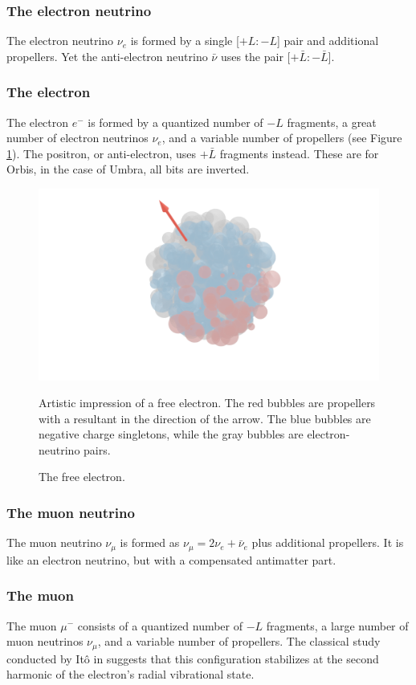 \documentclass[12pt]{article}
\begin{document}
\subsubsection{The electron neutrino}
The electron neutrino $\nu_e$ is formed by a single [$+L:-L$] pair and additional propellers. Yet the anti-electron neutrino $\bar{\nu}$ uses the pair [$+\bar{L}:-\bar{L}$].

\subsubsection{The electron}
The electron $e^-$ is formed by a quantized number of $-L$ fragments, a great number of electron neutrinos $\nu_e$, and a variable number of propellers (see Figure \ref{fig:electron}). The positron, or anti-electron, uses $+\bar{L}$ fragments instead. These are for Orbis, in the case of Umbra, all bits are inverted.

\begin{figure}
\centering
\includegraphics[width=\linewidth]{fig1}
\caption{The free electron.}
\footnotesize{Artistic impression of a free electron. The red bubbles are propellers with a resultant in the direction of the arrow. The blue bubbles are negative charge singletons, while the gray bubbles are electron-neutrino pairs.}
\label{fig:electron}
\end{figure}

\subsubsection{The muon neutrino}
The muon neutrino $\nu_{\mu}$ is formed as $\nu_{\mu}=2\nu_e+\bar{\nu}_e$ plus additional propellers. It is like an electron neutrino, but with a compensated antimatter part.

\subsubsection{The muon}  
The muon $\mu^-$ consists of a quantized number of $-L$ fragments, a large number of muon neutrinos $\nu_{\mu}$, and a variable number of propellers. The classical study conducted by Itô in \cite{ito} suggests that this configuration stabilizes at the second harmonic of the electron's radial vibrational state.
\end{document}
